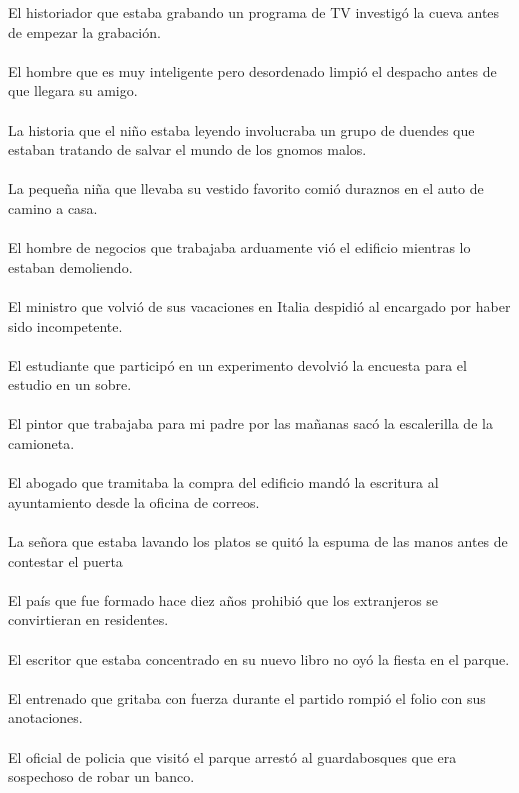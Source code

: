 El historiador que estaba grabando un programa de TV investigó la cueva antes de empezar la grabación.	\\	\\
El hombre que es muy inteligente pero desordenado limpió el despacho antes de que llegara su amigo.	\\	\\
La historia que el niño estaba leyendo involucraba un grupo de duendes que estaban tratando de salvar el mundo de los gnomos malos.	\\	\\
La pequeña niña que llevaba su vestido favorito comió duraznos en el auto de camino a casa.	\\	\\
El hombre de negocios que trabajaba arduamente vió el edificio mientras lo estaban demoliendo.	\\	\\
El ministro que volvió de sus vacaciones en Italia despidió al encargado por haber sido incompetente.	\\	\\
El estudiante que participó en un experimento devolvió la encuesta para el estudio en un sobre.	\\	\\
El pintor que trabajaba para mi padre por las mañanas sacó la escalerilla de la camioneta.	\\	\\
El abogado que tramitaba la compra del edificio mandó la escritura al ayuntamiento desde la oficina de correos.	\\	\\
La señora que estaba lavando los platos se quitó la espuma de las manos antes de contestar el puerta	\\	\\
El país que fue formado hace diez años prohibió que los extranjeros se convirtieran en residentes.	\\	\\
El escritor que estaba concentrado en su nuevo libro no oyó la fiesta en el parque.	\\	\\
El entrenado que gritaba con fuerza durante el partido rompió el folio con sus anotaciones.	\\	\\
El oficial de policia que visitó el parque arrestó al guardabosques que era sospechoso de robar un banco.	\\	\\
